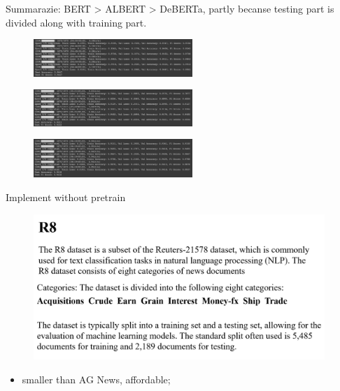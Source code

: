 \documentclass{beamer}
\begin{document}
\begin{frame}
  Summarazie: BERT > ALBERT > DeBERTa, partly becanse testing part is divided along with training part.
  \begin{figure}[H]
    \centering
    \includegraphics[width=6cm]{pictures/bertrun.png}
  \end{figure}
  \begin{figure}[H]
    \centering
    \includegraphics[width=6cm]{pictures/albertrun.png}
  \end{figure}
  \begin{figure}[H]
    \centering
    \includegraphics[width=6cm]{pictures/debertarun.png}
  \end{figure}
\end{frame}
\begin{frame}{Implement without pretrain}
  \begin{figure}[H]
    \centering
    \includegraphics[width=11cm]{pictures/R8.png}
  \end{figure}
  \begin{itemize}
    \item smaller than AG News, affordable;
  \end{itemize}
\end{frame}
\end{document}
